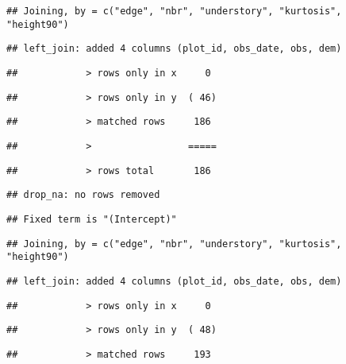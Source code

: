 \documentclass[
]{article}
\begin{document}
\begin{verbatim}
## Joining, by = c("edge", "nbr", "understory", "kurtosis", "height90")
\end{verbatim}

\begin{verbatim}
## left_join: added 4 columns (plot_id, obs_date, obs, dem)
\end{verbatim}

\begin{verbatim}
##            > rows only in x     0
\end{verbatim}

\begin{verbatim}
##            > rows only in y  ( 46)
\end{verbatim}

\begin{verbatim}
##            > matched rows     186
\end{verbatim}

\begin{verbatim}
##            >                 =====
\end{verbatim}

\begin{verbatim}
##            > rows total       186
\end{verbatim}

\begin{verbatim}
## drop_na: no rows removed
\end{verbatim}

\begin{verbatim}
## Fixed term is "(Intercept)"
\end{verbatim}

\begin{verbatim}
## Joining, by = c("edge", "nbr", "understory", "kurtosis", "height90")
\end{verbatim}

\begin{verbatim}
## left_join: added 4 columns (plot_id, obs_date, obs, dem)
\end{verbatim}

\begin{verbatim}
##            > rows only in x     0
\end{verbatim}

\begin{verbatim}
##            > rows only in y  ( 48)
\end{verbatim}

\begin{verbatim}
##            > matched rows     193
\end{verbatim}
\end{document}
